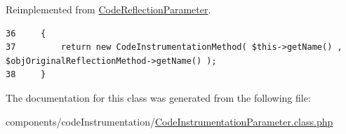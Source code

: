 Reimplemented from \hyperlink{class_code_reflection_parameter_ec7c1d4b204b6e3a6291d3b867afb688}{CodeReflectionParameter}.

\begin{Code}\begin{verbatim}36     {
37         return new CodeInstrumentationMethod( $this->getName() , $objOriginalReflectionMethod->getName() );
38     }
\end{verbatim}
\end{Code}




The documentation for this class was generated from the following file:\begin{CompactItemize}
\item 
components/codeInstrumentation/\hyperlink{_code_instrumentation_parameter_8class_8php}{CodeInstrumentationParameter.class.php}\end{CompactItemize}
